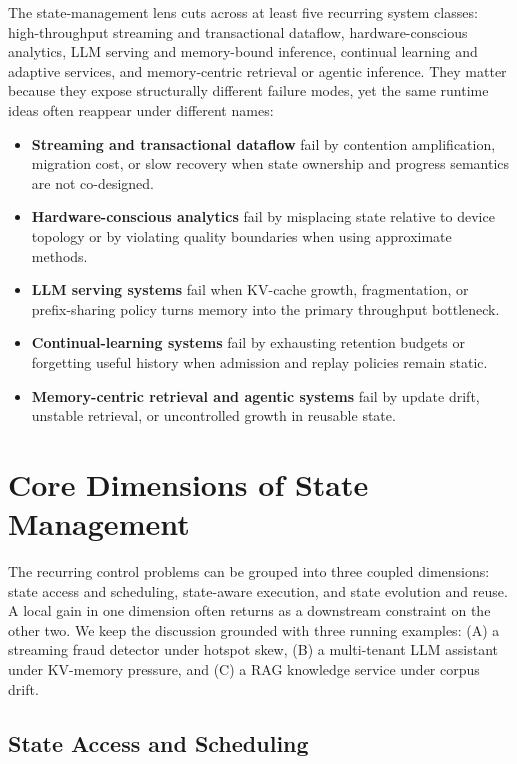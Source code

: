 \documentclass[manuscript,nonacm]{acmart}
\begin{document}
The state-management lens cuts across at least five recurring system classes: high-throughput streaming and transactional dataflow, hardware-conscious analytics, LLM serving and memory-bound inference, continual learning and adaptive services, and memory-centric retrieval or agentic inference. They matter because they expose structurally different failure modes, yet the same runtime ideas often reappear under different names:
\begin{itemize}[leftmargin=*]
\item \textbf{Streaming and transactional dataflow} fail by contention amplification, migration cost, or slow recovery when state ownership and progress semantics are not co-designed.
\item \textbf{Hardware-conscious analytics} fail by misplacing state relative to device topology or by violating quality boundaries when using approximate methods.
\item \textbf{LLM serving systems} fail when KV-cache growth, fragmentation, or prefix-sharing policy turns memory into the primary throughput bottleneck.
\item \textbf{Continual-learning systems} fail by exhausting retention budgets or forgetting useful history when admission and replay policies remain static.
\item \textbf{Memory-centric retrieval and agentic systems} fail by update drift, unstable retrieval, or uncontrolled growth in reusable state.
\end{itemize}

\section{Core Dimensions of State Management}
\label{sec:core-dimensions}

The recurring control problems can be grouped into three coupled dimensions: state access and scheduling, state-aware execution, and state evolution and reuse. A local gain in one dimension often returns as a downstream constraint on the other two. We keep the discussion grounded with three running examples: (A) a streaming fraud detector under hotspot skew, (B) a multi-tenant LLM assistant under KV-memory pressure, and (C) a RAG knowledge service under corpus drift.

\subsection{State Access and Scheduling}
\end{document}
